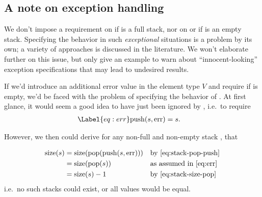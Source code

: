 \clearpage

\subsection{A note on exception handling}

We don't impose a requirement on  if 
is a full stack, nor on  or  if  is an
empty stack.
%
Specifying the behavior in such \emph{exceptional} situations is a
problem by its own; a variety of approaches is discussed in the
literature.
%
We won't elaborate further on this issue, but only give an example to warn
about ``innocent-looking'' exception specifications that may lead to
undesired results.

If we'd introduce an additional error value  in the element type 
$V$ and require  if  is empty, we'd be faced
with the problem of specifying the behavior of .
%
At first glance, it would seem a good idea to have  just been
ignored by , i.e.\ to require
\begin{align}
\Label{eq:err}
\mathrm{push}(s,\mathrm{err}) & = s.
\end{align}

However, we then could derive for any non-full and non-empty stack , that

\begin{align*}
\mathrm{size}(s)
   &=  \mathrm{size}(\mathrm{pop}(\mathrm{push}(s, \mathrm{err}))) && \text{by \ref{eq:stack-pop-push}}\\
   &=  \mathrm{size}(\mathrm{pop}(s)) && \text{as assumed in \ref{eq:err}}\\
   &=  \mathrm{size}(s) - 1 && \text{by \ref{eq:stack-size-pop}}\\
\end{align*}
%
i.e.\ no such stacks could exist, or all  values would be equal.


